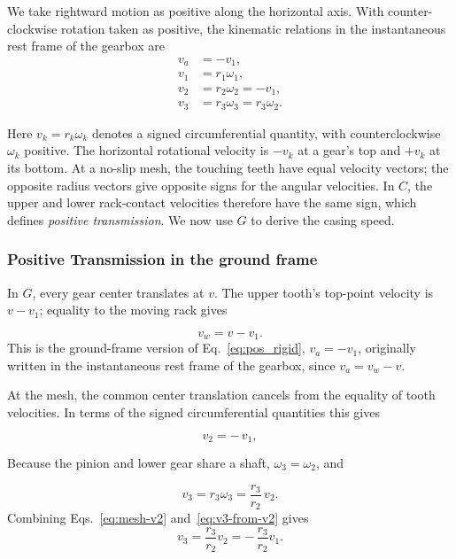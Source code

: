 \documentclass[reprint,aps,pra,longbibliography]{revtex4-2}
\begin{document}
We take rightward motion as positive along the horizontal axis.
With counter-clockwise rotation taken as positive, the kinematic relations in
the instantaneous rest frame of the gearbox are
\begin{align}
v_a &= -v_1,  \label{eq:pos_rigid}\\
v_1 &= r_1 \omega_1,\\
v_2 &= r_2 \omega_2 = -v_1, \label{eq:pos_mesh}\\
v_3 &= r_3 \omega_3 = r_3 \omega_2.
\end{align}

Here \(v_k=r_k\omega_k\) denotes a signed circumferential quantity, with counterclockwise \(\omega_k\) positive. The horizontal rotational velocity is \(-v_k\) at a gear's top and \(+v_k\) at its bottom. At a no-slip mesh, the touching teeth have equal velocity vectors; the opposite radius vectors give opposite signs for the angular velocities. In \(C\), the upper and lower rack-contact velocities therefore have the same sign, which defines \emph{positive transmission}. We now use \(G\) to derive the casing speed.



\subsubsection{Positive Transmission in the ground frame}
\label{sec:gearbox-ground-frame}


In \(G\), every gear center translates at \(v\). The upper tooth's top-point velocity is \(v-v_1\); equality to the moving rack gives

\begin{equation}
v_w = v - v_1.
\label{eq:upper-noslip-ground}
\end{equation}
This is the ground-frame version of Eq.~\eqref{eq:pos_rigid}, $v_a = -v_1$, originally written in the instantaneous rest frame of the gearbox, since $v_a=v_w-v$.



At the mesh, the common center translation cancels from the equality of tooth velocities. In terms of the signed circumferential quantities this gives

\begin{equation}
v_2 = -\,v_1,
\label{eq:mesh-v2}
\end{equation}

Because the pinion and lower gear share a shaft, \(\omega_3=\omega_2\), and

\begin{equation}
v_3 = r_3 \omega_3 = \frac{r_3}{r_2}\,v_2.
\label{eq:v3-from-v2}
\end{equation}
Combining Eqs.~\eqref{eq:mesh-v2} and~\eqref{eq:v3-from-v2} gives
\begin{equation}
v_3 = \frac{r_3}{r_2} v_2
    = -\,\frac{r_3}{r_2} v_1.
\label{eq:v3-v1}
\end{equation}
\end{document}

